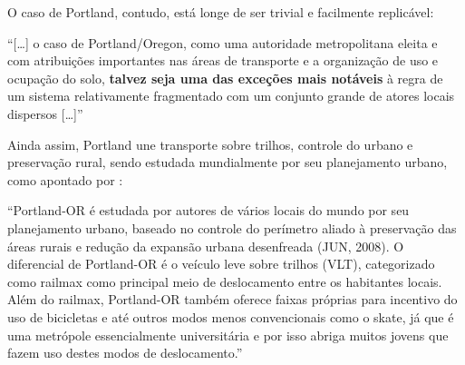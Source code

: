 	O caso de Portland, contudo, está longe de ser trivial e facilmente replicável:
	
	\begin{citacao}
		``[\dots] o caso de Portland/Oregon, como uma autoridade metropolitana eleita e com atribuições importantes nas áreas de transporte e a organização de uso e ocupação do solo, \textbf{talvez seja uma das exceções mais notáveis} à regra de um sistema relativamente fragmentado com um conjunto grande de atores locais dispersos [\dots]'' \cite[p. 224]{klink2009a}
	\end{citacao}

	Ainda assim, Portland une transporte sobre trilhos, controle do urbano e preservação rural, sendo estudada mundialmente por seu planejamento urbano, como apontado por :
	
	\begin{citacao}
		``Portland-OR é estudada por autores de vários locais do mundo por seu planejamento urbano, baseado no controle do perímetro aliado à preservação das áreas rurais e redução da expansão urbana desenfreada (JUN, 2008). O diferencial de Portland-OR é o veículo leve sobre trilhos (VLT), categorizado como railmax como principal meio de deslocamento entre os habitantes locais. Além do railmax, Portland-OR também oferece faixas próprias para incentivo do uso de bicicletas e até outros modos menos convencionais como o skate, já que é uma metrópole essencialmente universitária e por isso abriga muitos jovens que fazem uso destes modos de deslocamento.'' \cite[p. 17]{noronha2015a}
	\end{citacao}
	
	
	\postextual
	
	
	
	
	\renewcommand{\glossaryname}{Glossário}
	\renewcommand*{\glsseeformat}[3][\seename]{\textit{#1}
		\glsseelist{#2}}
	
